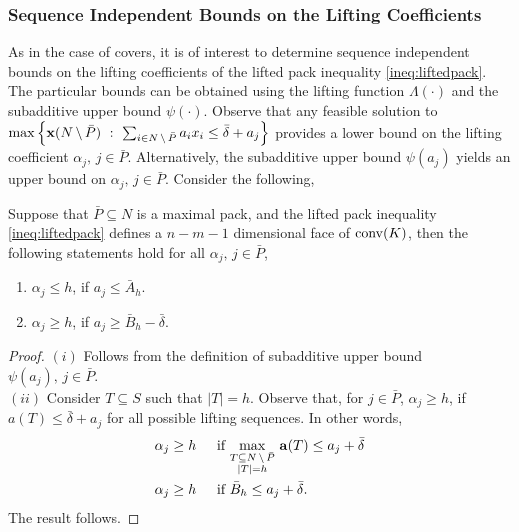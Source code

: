 \documentclass[10pt,twoside]{amsart}
\begin{document}
\subsubsection{Sequence Independent Bounds on the Lifting Coefficients}\hfill

As in the case of covers, it is of interest to determine sequence independent bounds on the lifting coefficients of the lifted pack inequality \eqref{ineq:liftedpack}. The particular bounds can be obtained using the lifting function $\Lambda(\cdot)$ and the subadditive upper bound $\psi(\cdot)$. Observe that any feasible solution to $\max\left\{ {\mathbf{x}(N\,\backslash\, \bar{P})} \ : \ {\sum_{i \in N\,\backslash\, \bar{P}} a_i x_i \leq \bar{\delta} + a_j} \right\}$ provides a lower bound on the lifting coefficient $\alpha_j,\, j \in \bar{P}$. Alternatively, the subadditive upper bound $\psi(a_j)$ yields an upper bound on $\alpha_j,\, j \in \bar{P}$. Consider the following,

\begin{prop}
\label{prop:seqindpacks}
  Suppose that $\bar{P} \subseteq N$ is a maximal pack, and the lifted pack inequality \eqref{ineq:liftedpack} defines a $n-m-1$ dimensional face of $\operatorname{conv}(K)$, then the following statements hold for all $\alpha_j,\, j \in \bar{P}$,
  \begin{enumerate}[label=(\roman{*})]
    \item $\alpha_j \leq h$, if $a_j \leq \bar{A}_h$.
    \item $\alpha_j \geq h$, if $a_j \geq \bar{B}_h - \bar{\delta}$.
  \end{enumerate}
\end{prop}
\begin{proof}
  $(i)$ Follows from the definition of subadditive upper bound $\psi(a_j),\,j \in \bar{P}$.\\
  $(ii)$ Consider $T \subseteq S$ such that $|T| = h$. Observe that, for $j \in \bar{P}$, $\alpha_j \geq h$, if $a(T) \leq \bar{\delta} + a_j$ for all possible lifting sequences. In other words,
  \begin{align*}
    \alpha_j \geq h & \hspace{4mm} \text{ if } \underset{\substack{T\subseteq N\,\backslash\, \bar{P}\\|T| = h}}{\max}\,\, \mathbf{a}(T) \leq a_j + \bar{\delta}\\
    \alpha_j \geq h & \hspace{4mm} \text{ if } \bar{B}_h \leq a_j + \bar{\delta}.
  \end{align*}
  The result follows.
\end{proof}
\end{document}
